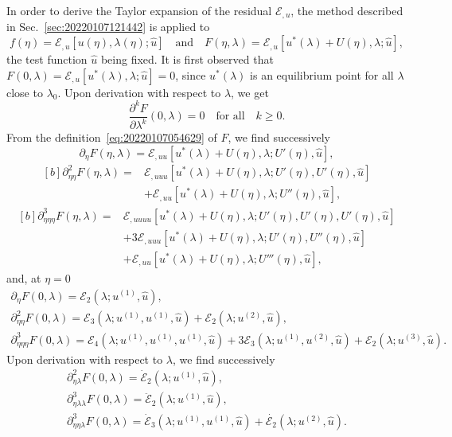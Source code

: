\documentclass[12pt, final]{scrartcl}
\theoremstyle{definition}
\newcommand{\E}{\mathcal E}
\newcommand{\order}[2][1]{#2^{(#1)}}
\begin{document}
In order to derive the Taylor expansion of the residual $\E_{,u}$, the method
described in Sec.~\ref{sec:20220107121442} is applied to
\begin{equation}
  \label{eq:20220107054629}
  f(η) = \E_{, u} [u(η), \lambda(η); \hat{u}]
  \quad \text{and} \quad
  F(η, \lambda) = \E_{, u}[u^{\ast}(\lambda) + U(η), \lambda; \hat{u}],
\end{equation}
the test function $\hat{u}$ being fixed. It is first observed that
$F(0, \lambda) = \E_{, u} [u^{\ast} (\lambda), \lambda; \hat{u}] = 0$, since $u^{\ast}(\lambda)$ is
an equilibrium point for all $\lambda$ close to $\lambda_0$. Upon derivation with respect
to $\lambda$, we get
\begin{equation*}
  \frac{∂^k F}{∂ \lambda^k}(0, \lambda) = 0 \quad \text{for all} \quad k ≥ 0.
\end{equation*}
From the definition~\eqref{eq:20220107054629} of $F$, we find successively
\begin{equation*}
  ∂_{η}F(η, \lambda) = \E_{, u u}[u^{\ast}(\lambda) + U(η), \lambda; U'(η), \hat{u}],
\end{equation*}
\begin{equation*}
  \begin{aligned}[b]
    ∂_{η η}^2 F(η, \lambda) ={}
    & \E_{, uuu}[u^{\ast}(\lambda) + U(η), \lambda; U'(η), U'(η), \hat{u}]\\
    & + \E_{, uu} [u^{\ast}(\lambda) + U(η), \lambda; U''(η), \hat{u}],
  \end{aligned}
\end{equation*}
\begin{equation*}
  \begin{aligned}[b]
    ∂_{ηηη}^3 F(η, \lambda) ={}
    & \E_{, uuuu}[u^{\ast}(\lambda) + U(η), \lambda; U'(η), U'(η), U'(η), \hat{u}]\\
    & + 3\E_{, u u u}[u^{\ast}(\lambda) + U(η), \lambda; U'(η), U''(η), \hat{u}]\\
    & + \E_{, uu}[u^{\ast}(\lambda) + U(η), \lambda; U'''(η), \hat{u}],
  \end{aligned}
\end{equation*}
and, at $η = 0$
\begin{gather*}
  ∂_{η}F(0, \lambda) = \E_2(\lambda; \order[1]u, \hat{u}),\\
  ∂_{ηη}^2 F(0, \lambda) = \E_3(\lambda; \order[1]u, \order[1]u, \hat{u}) + \E_2(\lambda; \order[2]u, \hat{u}),\\
  ∂_{ηηη}^3 F(0, \lambda) = \E_4(\lambda; \order[1]u, \order[1]u, \order[1]u, \hat{u}) + 3\E_3(\lambda; \order[1]u, \order[2]u, \hat{u}) + \E_2(\lambda; \order[3]u, \hat{u}).
\end{gather*}
Upon derivation with respect to $\lambda$, we find successively
\begin{gather*}
  ∂_{η\lambda}^2 F(0, \lambda) = \dot{\E}_2(\lambda; \order[1]u, \hat{u}),\\
  ∂_{η\lambda\lambda}^3 F(0, \lambda) = \ddot{\E}_2(\lambda; \order[1]u, \hat{u}),\\
  ∂_{ηη\lambda}^3 F(0, \lambda) = \dot{\E}_3(\lambda; \order[1]u, \order[1]u, \hat{u}) + \dot{\E_2}(\lambda; \order[2]u, \hat{u}).
\end{gather*}
\end{document}

